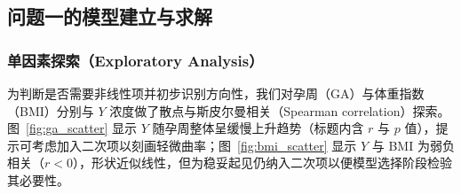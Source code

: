 \documentclass[12pt,a4paper]{ctexart}
\numberwithin{equation}{section}
\theoremstyle{mcm}
\begin{document}
\subsection{问题一的模型建立与求解}
{\begingroup
  \setcounter{secnumdepth}{3} %
  \let\SavedSubsubsection\subsubsection
  \renewcommand{\subsection}{\SavedSubsubsection}
  \renewcommand{\subsubsection}{\paragraph}

\subsection{单因素探索（Exploratory Analysis）}
为判断是否需要非线性项并初步识别方向性，我们对孕周（GA）与体重指数（BMI）分别与 $Y$ 浓度做了散点与斯皮尔曼相关（Spearman correlation）探索。图~\ref{fig:ga_scatter} 显示 $Y$ 随孕周整体呈缓慢上升趋势（标题内含 $r$ 与 $p$ 值），提示可考虑加入二次项以刻画轻微曲率；图~\ref{fig:bmi_scatter} 显示 $Y$ 与 BMI 为弱负相关（$r<0$），形状近似线性，但为稳妥起见仍纳入二次项以便模型选择阶段检验其必要性。

}
\end{document}
